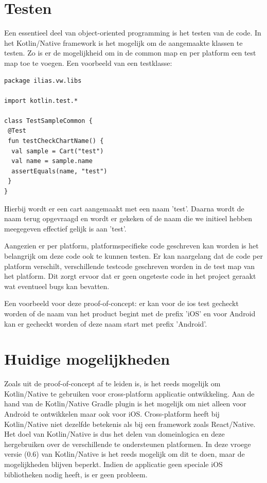 \section{Testen}
\label{sec:testing}
Een essentieel deel van object-oriented programming is het testen van de code. In het Kotlin/Native framework is het mogelijk om de aangemaakte klassen te testen. Zo is er de mogelijkheid om in de common map en per platform een test map toe te voegen. Een voorbeeld van een testklasse:

\begin{lstlisting}
package ilias.vw.libs

import kotlin.test.*

class TestSampleCommon {
 @Test
 fun testCheckChartName() {
  val sample = Cart("test")
  val name = sample.name
  assertEquals(name, "test")
 }
}

\end{lstlisting}

Hierbij wordt er een cart aangemaakt met een naam 'test'. Daarna wordt de naam terug opgevraagd en wordt er gekeken of de naam die we initieel hebben meegegeven effectief gelijk is aan 'test'.

Aangezien er per platform, platformspecifieke code geschreven kan worden is het belangrijk om deze code ook te kunnen testen. Er kan naargelang dat de code per platform verschilt, verschillende testcode geschreven worden in de test map van het platform. Dit zorgt ervoor dat er geen ongeteste code in het project geraakt wat eventueel bugs kan bevatten. 

Een voorbeeld voor deze proof-of-concept: er kan voor de ios test gecheckt worden of de naam van het product begint met de prefix 'iOS' en voor Android kan er gecheckt worden of deze naam start met prefix 'Android'.

\section{Huidige mogelijkheden}
Zoals uit de proof-of-concept af te leiden is, is het reeds mogelijk om Kotlin/Native te gebruiken voor cross-platform applicatie ontwikkeling. Aan de hand van de Kotlin/Native Gradle plugin is het mogelijk om niet alleen voor Android te ontwikkelen maar ook voor iOS. Cross-platform heeft bij Kotlin/Native niet dezelfde betekenis als bij een framework zoals React/Native. Het doel van Kotlin/Native is dus het delen van domeinlogica en deze hergebruiken over de verschillende te ondersteunen platformen. In deze vroege versie (0.6) van Kotlin/Native is het reeds mogelijk om dit te doen, maar de mogelijkheden blijven beperkt. Indien de applicatie geen speciale iOS bibliotheken nodig heeft, is er geen probleem.

